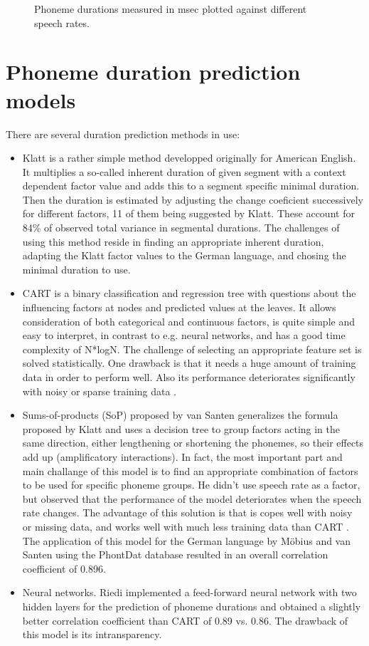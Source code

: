 \documentclass[a4paper]{scrreprt}
\begin{document}
\begin{figure}[htbp]
\begin{subfigure}[h]{0.48\textwidth}
	\label{fig:wsr}
	\end{subfigure}
\caption[Speech rate vs long vowel duration]{Phoneme durations measured in msec plotted against different speech rates.}
\label{fig:SR_corr}
\end{figure}

\chapter{Phoneme duration prediction models}
There are several duration prediction methods in use: 
\begin{itemize}
	\item Klatt \cite{Klatt1979} is a rather simple method developped originally for American English. It multiplies a so-called inherent duration of given segment with a context dependent factor value and adds this to a segment specific minimal duration. Then the duration is estimated by adjusting the change coeficient successively for different factors, 11 of them being suggested by Klatt. These account for 84\% of observed total variance in segmental durations. The challenges of using this method reside in finding an appropriate inherent duration, adapting the Klatt factor values to the German language, and chosing the minimal duration to use.
	\item CART \cite{Riley1992} is a binary classification and regression tree with questions about the influencing factors at nodes and predicted values at the leaves. It allows consideration of both categorical and continuous factors, is quite simple and easy to interpret, in contrast to e.g. neural networks, and has a good time complexity of N*logN. The challenge of selecting an appropriate feature set is solved statistically. One drawback is that it needs a huge amount of training data in order to perform well. Also its performance deteriorates significantly with noisy or sparse training data \cite{Moebius1996}.
	\item Sums-of-products (SoP) proposed by van Santen \cite{Santen1994} generalizes the formula proposed by Klatt and uses a decision tree to group factors acting in the same direction, either lengthening or shortening the phonemes, so their effects add up (amplificatory interactions). In fact, the most important part and main challange of this model is to find an appropriate combination of factors to be used for specific phoneme groups. He didn't use speech rate as a factor, but observed that the performance of the model deteriorates when the speech rate changes. The advantage of this solution is that is copes well with noisy or missing data, and works well with much less training data than CART \cite{Moebius1996}. The application of this model for the German language by Möbius and van Santen using the PhontDat database resulted in an overall correlation coefficient of 0.896.
	\item Neural networks. Riedi \cite{Riedi1995} implemented a feed-forward neural network with two hidden layers for the prediction of phoneme durations and obtained a slightly better correlation coefficient than CART of 0.89 vs. 0.86. The drawback of this model is its intransparency.
\end{itemize}
\end{document}
